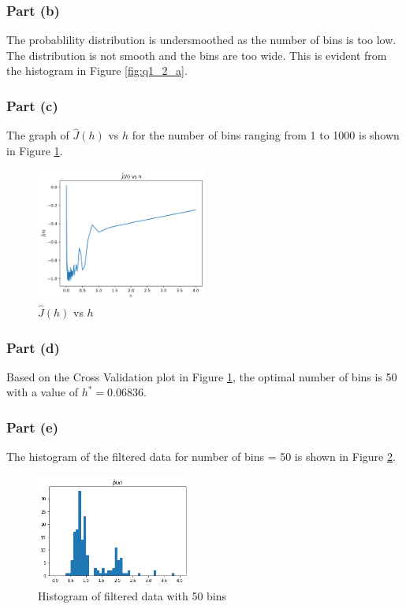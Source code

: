 \subsubsection{Part (b)}

The probablility distribution is undersmoothed as the number of bins is too low. The distribution is not smooth and the bins are too wide. This is evident from the histogram in Figure \ref{fig:q1_2_a}.

\subsubsection{Part (c)}

The graph of $\hat{J}(h)$ vs $h$ for the number of bins ranging from 1 to 1000 is shown in Figure \ref{fig:q1_2_c}.

\begin{figure}[H]
    \centering
    \includegraphics[width=0.5\textwidth]{../q1/images/crossvalidation.png}
    \caption{$\hat{J}(h)$ vs $h$}
    \label{fig:q1_2_c}
\end{figure}

\subsubsection{Part (d)}

Based on the Cross Validation plot in Figure \ref{fig:q1_2_c}, the optimal number of bins is 50 with a value of $h^\ast = 0.06836$.

\subsubsection{Part (e)}

The histogram of the filtered data for number of bins = 50 is shown in Figure \ref{fig:q1_2_e}.

\begin{figure}[H]
    \centering
    \includegraphics[width=0.45\textwidth]{../q1/images/optimalhistogram.png}
    \caption{Histogram of filtered data with 50 bins}
    \label{fig:q1_2_e}
\end{figure}

\newpage